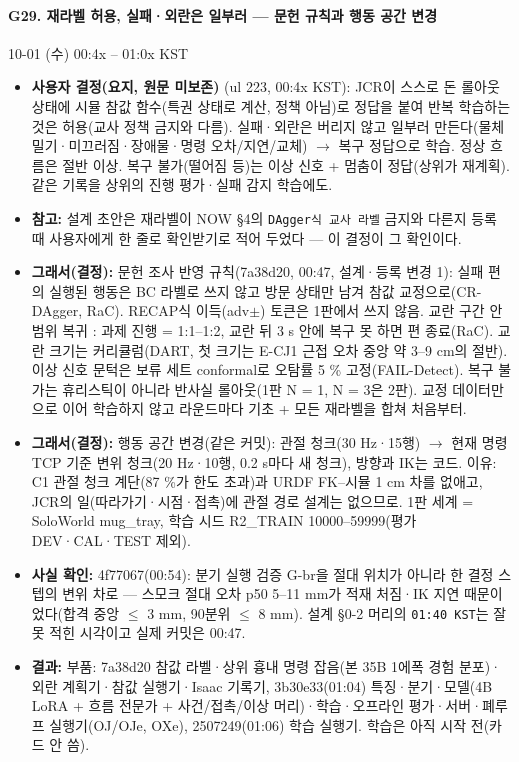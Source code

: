 \paragraph{G29. 재라벨 허용, 실패·외란은 일부러 --- 문헌 규칙과 행동 공간 변경}
{\small 10-01 (수) 00:4x -- 01:0x KST}
\begin{itemize}
  \item \textbf{사용자 결정(요지, 원문 미보존)} (ul 223, 00:4x KST): JCR이 스스로 돈 롤아웃 상태에 시뮬 참값 함수(특권 상태로 계산, 정책 아님)로 정답을 붙여 반복 학습하는 것은 허용(교사 정책 금지와 다름). 실패·외란은 버리지 않고 일부러 만든다(물체 밀기·미끄러짐·장애물·명령 오차/지연/교체) $\rightarrow$ 복구 정답으로 학습. 정상 흐름은 절반 이상. 복구 불가(떨어짐 등)는 이상 신호 + 멈춤이 정답(상위가 재계획). 같은 기록을 상위의 진행 평가·실패 감지 학습에도.
  \item \textbf{참고:} 설계 초안은 재라벨이 NOW §4의 \texttt{DAgger식 교사 라벨} 금지와 다른지 등록 때 사용자에게 한 줄로 확인받기로 적어 두었다 --- 이 결정이 그 확인이다.
  \item \textbf{그래서(결정):} 문헌 조사 반영 규칙(7a38d20, 00:47, 설계·등록 변경 1): 실패 편의 실행된 행동은 BC 라벨로 쓰지 않고 방문 상태만 남겨 참값 교정으로(CR-DAgger, RaC). RECAP식 이득(adv$\pm$) 토큰은 1판에서 쓰지 않음. 교란 구간 안 범위 복귀 : 과제 진행 = 1:1--1:2, 교란 뒤 3 s 안에 복구 못 하면 편 종료(RaC). 교란 크기는 커리큘럼(DART, 첫 크기는 E-CJ1 근접 오차 중앙 약 3--9 cm의 절반). 이상 신호 문턱은 보류 세트 conformal로 오탐률 5 \% 고정(FAIL-Detect). 복구 불가는 휴리스틱이 아니라 반사실 롤아웃(1판 N = 1, N = 3은 2판). 교정 데이터만으로 이어 학습하지 않고 라운드마다 기초 + 모든 재라벨을 합쳐 처음부터.
  \item \textbf{그래서(결정):} 행동 공간 변경(같은 커밋): 관절 청크(30 Hz·15행) $\rightarrow$ 현재 명령 TCP 기준 변위 청크(20 Hz·10행, 0.2 s마다 새 청크), 방향과 IK는 코드. 이유: C1 관절 청크 계단(87 \%가 한도 초과)과 URDF FK--시뮬 1 cm 차를 없애고, JCR의 일(따라가기·시점·접촉)에 관절 경로 설계는 없으므로. 1판 세계 = SoloWorld mug\_tray, 학습 시드 R2\_TRAIN 10000--59999(평가 DEV·CAL·TEST 제외).
  \item \textbf{사실 확인:} 4f77067(00:54): 분기 실행 검증 G-br을 절대 위치가 아니라 한 결정 스텝의 변위 차로 --- 스모크 절대 오차 p50 5--11 mm가 적재 처짐·IK 지연 때문이었다(합격 중앙 $\leq$ 3 mm, 90분위 $\leq$ 8 mm). 설계 §0-2 머리의 \texttt{01:40 KST}는 잘못 적힌 시각이고 실제 커밋은 00:47.
  \item \textbf{결과:} 부품: 7a38d20 참값 라벨·상위 흉내 명령 잡음(본 35B 1에폭 경험 분포)·외란 계획기·참값 실행기·Isaac 기록기, 3b30e33(01:04) 특징·분기·모델(4B LoRA + 흐름 전문가 + 사건/접촉/이상 머리)·학습·오프라인 평가·서버·폐루프 실행기(OJ/OJe, OXe), 2507249(01:06) 학습 실행기. 학습은 아직 시작 전(카드 안 씀).
\end{itemize}

